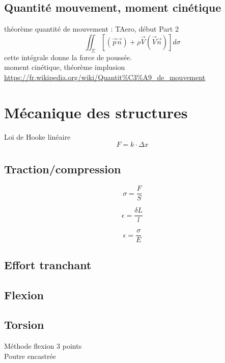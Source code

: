 \subsection{Quantité mouvement, moment cinétique}
théorème quantité de mouvement : TAero, début Part 2\\
\begin{equation}
\iint_\Sigma [(\vec{p} \vec{n})+\rho \vec{V}(\vec{V} \vec{n})]d\sigma
\end{equation}
cette intégrale donne la force de poussée. \\
moment cinétique, théorème implusion\\
\url{https://fr.wikipedia.org/wiki/Quantit%C3%A9_de_mouvement}

	
	\newpage
	\section{Mécanique des structures}
	
	Loi de Hooke linéaire
	\begin{equation}
	F=k\cdot \Delta x
	\end{equation}
	
	\subsection{Traction/compression}
	\begin{equation}
	\sigma=\frac{F}{S}
	\end{equation}
	
	\begin{equation}
	\epsilon=\frac{\delta L}{l}
	\end{equation}
	
	\begin{equation}
	\epsilon=\frac{\sigma}{E}
	\end{equation}
	
	\subsection{Effort tranchant}
	\subsection{Flexion}
	
	\subsection{Torsion}
	
	Méthode flexion 3 points\\
	Poutre encastrée
	
